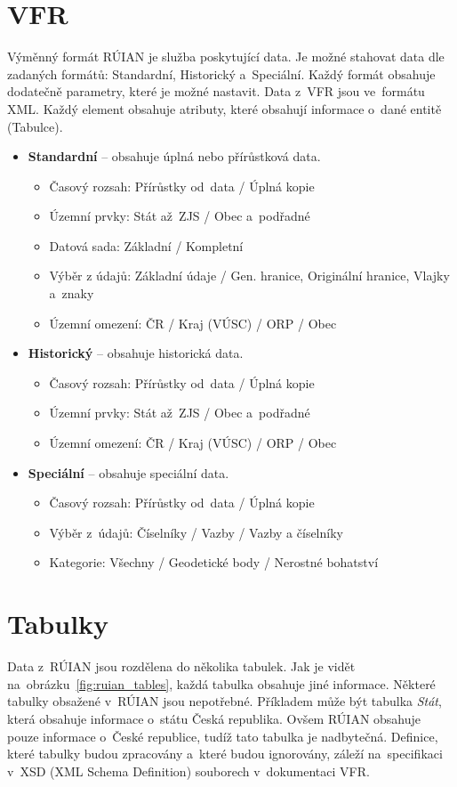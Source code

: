 \documentclass[czech, kiv, ba, he, iso690alph, pdf]{fasthesis}
\begin{document}
\section{VFR}
Výměnný formát RÚIAN je služba poskytující data.
Je možné stahovat data dle zadaných formátů: Standardní, Historický a~Speciální.
Každý formát obsahuje dodatečně parametry, které je možné nastavit.
Data z~VFR jsou ve~formátu XML.
Každý element obsahuje atributy, které obsahují informace o~dané entitě (Tabulce).
\pagebreak
\begin {itemize}
    \item \textbf{Standardní} -- obsahuje úplná nebo přírůstková data.
    \begin {itemize}
        \item Časový rozsah: Přírůstky od~data / Úplná kopie
        \item Územní prvky: Stát až~ZJS / Obec a~podřadné
        \item Datová sada: Základní / Kompletní
        \item Výběr z údajů: Základní údaje / Gen. hranice, Originální hranice, Vlajky a~znaky
        \item Územní omezení: ČR / Kraj (VÚSC) / ORP / Obec
    \end {itemize}
    \item \textbf{Historický} -- obsahuje historická data.
    \begin {itemize}
        \item Časový rozsah: Přírůstky od~data / Úplná kopie
        \item Územní prvky: Stát až~ZJS / Obec a~podřadné
        \item Územní omezení: ČR / Kraj (VÚSC) / ORP / Obec
    \end {itemize}
    \item \textbf{Speciální} -- obsahuje speciální data.
    \begin {itemize}
        \item Časový rozsah: Přírůstky od~data / Úplná kopie
        \item Výběr z~údajů: Číselníky / Vazby / Vazby a číselníky
        \item Kategorie: Všechny / Geodetické body / Nerostné bohatství
    \end {itemize}
\end {itemize}

\section{Tabulky}
Data z~RÚIAN jsou rozdělena do několika tabulek.
Jak je vidět na~obrázku~\ref{fig:ruian_tables}, každá tabulka obsahuje jiné informace.
Některé tabulky obsažené v~RÚIAN jsou nepotřebné. 
Příkladem může být tabulka \textit{Stát}, která obsahuje informace o~státu Česká republika.
Ovšem RÚIAN obsahuje pouze informace o~České republice, tudíž tato tabulka je nadbytečná.
Definice, které tabulky budou zpracovány a~které budou ignorovány, záleží na~specifikaci v~XSD (XML Schema Definition) souborech v~dokumentaci VFR. 
\pagebreak
\end{document}
